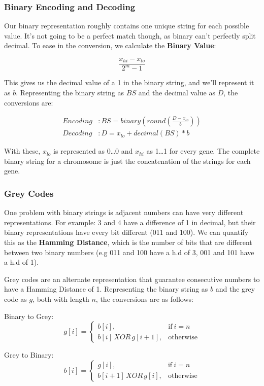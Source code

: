 \subsubsection{Binary Encoding and Decoding}
Our binary representation roughly contains one unique string for each possible value. It's not going to be a perfect match though, as binary can't perfectly split decimal. To ease in the conversion, we calculate the \textbf{Binary Value}:

\[
   \frac{x_{hi} - x_{lo}}{2^m - 1}
\]

This gives us the decimal value of a 1 in the binary string, and we'll represent it as $b$. Representing the binary string as $BS$ and the decimal value as $D$, the conversions are:

\begin{align}
    Encoding&:  BS = binary(round(\frac{D -  x_{lo}}{b}))\\
    Decoding&:  D  = x_{lo} + decimal(BS) * b
\end{align}

With these, $x_{lo}$ is represented as 0\dots0 and $x_{hi}$ as 1\dots1 for every gene. The complete binary string for a chromosome is just the concatenation of the strings for each gene.

\subsubsection{Grey Codes}
One problem with binary strings is adjacent numbers can have very different representations. For example: 3 and 4 have a difference of 1 in decimal, but their binary representations have every bit different (011 and 100). We can quantify this as the \textbf{Hamming Distance}, which is the number of bits that are different between two binary numbers (e.g 011 and 100 have a h.d of 3, 001 and 101 have a h.d of 1). 

Grey codes are an alternate representation that guarantee consecutive numbers to have a Hamming Distance of 1. Representing the binary string as $b$ and the grey code as $g$, both with length $n$, the conversions are as follows:

Binary to Grey:
\begin{equation}
    g[i] = 
      \begin{cases}
      b[i], & \text{if}\ i = n \\
      b[i]\, XOR\, g[i+1], & \text{otherwise}
    \end{cases}
\end{equation}

Grey to Binary:
\begin{equation}
    b[i] = 
      \begin{cases}
      g[i], & \text{if}\ i = n \\
      b[i+1]\, XOR\, g[i], & \text{otherwise}
    \end{cases}    
\end{equation}

